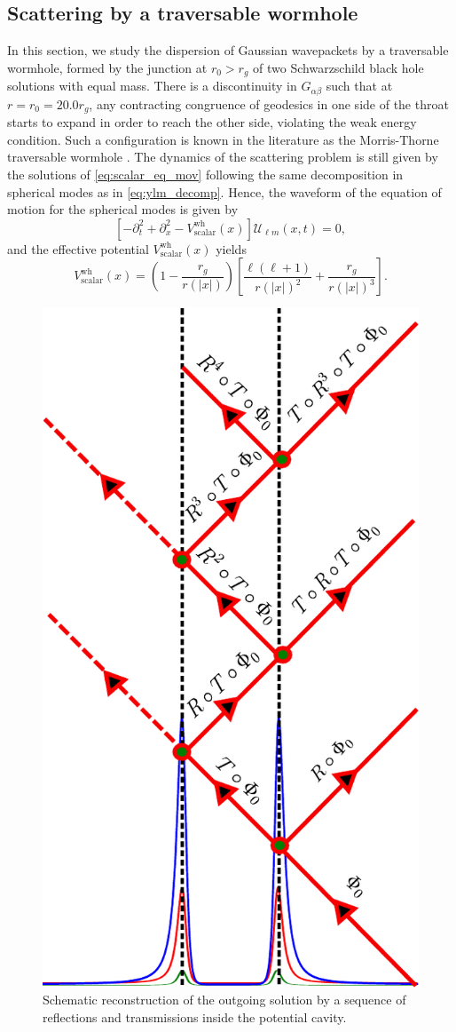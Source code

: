 \documentclass[article,aps,nofootinbib,twocolumn,superscriptaddress]{revtex4-1}
\begin{document}
\subsection{Scattering by a traversable wormhole}\label{subsec:wh} 
In this section, we study the dispersion of Gaussian wavepackets by a traversable wormhole, formed by the junction at $r_0>r_g$ of two Schwarzschild black hole solutions with equal mass. There is a discontinuity in $G_{\alpha\beta}$ such that at $r=r_0=20.0r_g$, any contracting congruence of geodesics in one side of the throat starts to expand in order to reach the other side, violating the weak energy condition. Such a configuration is known in the literature as the Morris-Thorne traversable wormhole \citep{doi:10.1119/1.15620}. 
The dynamics of the scattering problem is still given by the solutions of \eqref{eq:scalar_eq_mov} following the same decomposition in spherical modes as in \eqref{eq:ylm_decomp}. Hence, the waveform of the equation of motion for the spherical modes is given by
\begin{equation}
\left[-\partial_t^2+\partial_x^2-V^{\mathrm{wh}}_{\mathrm{scalar}}(x)\right]\mathcal{U}_{\ell m}(x,t) = 0,
\label{eq:wave_scalar_wh}
\end{equation}
and the effective potential $V^{\mathrm{wh}}_{\mathrm{scalar}}(x)$ yields
\begin{equation}
V^{\mathrm{wh}}_{\mathrm{scalar}}\left(x\right) = \left(1-\frac{r_g}{r\left(|x|\right)}\right)\left[\frac{\ell(\ell+1)}{r\left(|x|\right)^2}+\frac{r_g}{r\left(|x|\right)^3}\right].
\end{equation}   
\begin{figure}[t!]
\centering
\includegraphics[width=.3\textwidth]{figures/Geom_optics.pdf}
\caption{\label{fig:Geom_optics} Schematic reconstruction of the outgoing solution by a sequence of reflections and transmissions inside the potential cavity.}
\end{figure}
\end{document}
